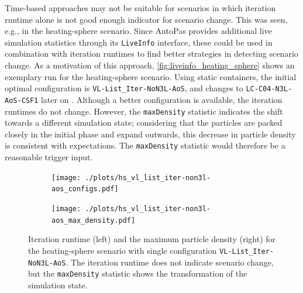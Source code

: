 Time-based approaches may not be suitable for scenarios in which iteration runtime alone is not good enough indicator for scenario change. This was seen, e.g., in the heating-sphere scenario. Since AutoPas provides additional live simulation statistics through its \texttt{LiveInfo} interface, these could be used in combination with iteration runtimes to find better strategies in detecting scenario change.
As a motivation of this approach, \autoref{fig:liveinfo_heating_sphere} shows an exemplary run for the heating-sphere scenario.
Using static containers, the initial optimal configuration is \texttt{VL-List\_Iter-NoN3L-AoS}, and changes to \texttt{LC-C04-N3L-AoS-CSF1} later on \cite{Newcome2025}. Although a better configuration is available, the iteration runtimes do not change. However, the  \texttt{maxDensity} statistic indicates the shift towards a different simulation state; considering that the particles are packed closely in the initial phase and expand outwards, this decrease in particle density is consistent with expectations. The \texttt{maxDensity} statistic would therefore be a reasonable trigger input.

\begin{figure}[htpb]
	\centering
	\begin{subfigure}{0.5\textwidth}
		\texttt{[image: ./plots/hs\_vl\_list\_iter-non3l-aos\_configs.pdf]}
	\end{subfigure}%
	\begin{subfigure}{0.5\textwidth}
		\texttt{[image: ./plots/hs\_vl\_list\_iter-non3l-aos\_max\_density.pdf]}
	\end{subfigure}
	\caption{Iteration runtime (left) and the maximum particle density (right) for the heating-sphere scenario with single configuration \texttt{VL-List\_Iter-NoN3L-AoS}. The iteration runtime does not indicate scenario change, but the \texttt{maxDensity} statistic shows the transformation of the simulation state.}
	\label{fig:liveinfo_heating_sphere}
\end{figure}





